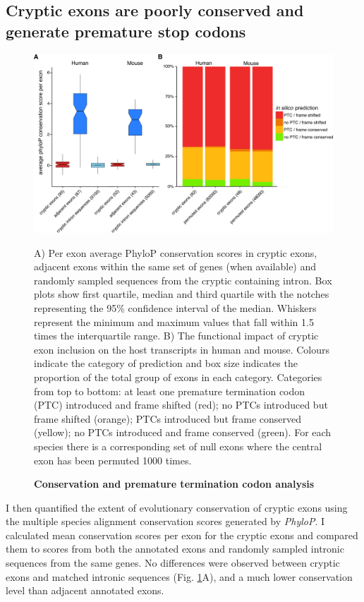 \subsection{Cryptic exons are poorly conserved and generate premature stop codons}

\begin{figure}[h!]
	\centering
	\includegraphics[width=\textwidth]{Figures/03_cryptic_exons/Figure_4_conservation_poison.png}
	\caption{\textbf{Conservation and premature termination codon analysis}} 
	A) Per exon average PhyloP conservation scores in cryptic exons, adjacent exons within the same set of genes (when available) and randomly sampled sequences from the cryptic containing intron. Box plots show first quartile, median and third quartile with the notches representing the 95\% confidence interval of the median. Whiskers represent the minimum and maximum values that fall within 1.5 times the interquartile range. B) The functional impact of cryptic exon inclusion on the host transcripts in human and mouse. Colours indicate the category of prediction and box size indicates the proportion of the total group of exons in each category. Categories from top to bottom: at least one premature termination codon (PTC) introduced and frame shifted (red); no PTCs introduced but frame shifted (orange); PTCs introduced but frame conserved (yellow); no PTCs introduced and frame conserved (green). For each species there is a corresponding set of null exons where the central exon has been permuted 1000 times.
	\label{fig:cryptic_conservation}
\end{figure}

I then quantified the extent of evolutionary conservation of cryptic exons using the multiple species alignment conservation scores generated by \textit{PhyloP}. I calculated mean conservation scores per exon for the cryptic exons and compared them to scores from both the annotated exons and randomly sampled intronic sequences from the same genes. No differences were observed between cryptic exons and matched intronic sequences (Fig. \ref{fig:cryptic_conservation}A), and a much lower conservation level than adjacent annotated exons.

